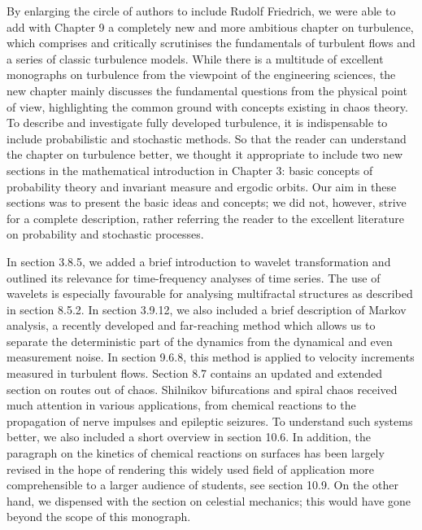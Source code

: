 \documentclass[12pt]{article}
\begin{document}
By enlarging the circle of authors to include Rudolf Friedrich, we were able to add
with Chapter 9 a completely new and more ambitious chapter on turbulence, which
comprises and critically scrutinises the fundamentals of turbulent flows and a series
of classic turbulence models. While there is a multitude of excellent monographs on
turbulence from the viewpoint of the engineering sciences, the new chapter mainly
discusses the fundamental questions from the physical point of view, highlighting
the common ground with concepts existing in chaos theory. To describe and investigate
fully developed turbulence, it is indispensable to include probabilistic and
stochastic methods. So that the reader can understand the chapter on turbulence
better, we thought it appropriate to include two new sections in the mathematical
introduction in Chapter 3: basic concepts of probability theory and invariant measure
and ergodic orbits. Our aim in these sections was to present the basic ideas and
concepts; we did not, however, strive for a complete description, rather referring
the reader to the excellent literature on probability and stochastic processes.

\hfill

In section 3.8.5, we added a brief introduction to wavelet transformation and outlined
its relevance for time-frequency analyses of time series. The use of wavelets
is especially favourable for analysing multifractal structures as described in section
8.5.2. In section 3.9.12, we also included a brief description of Markov analysis,
a recently developed and far-reaching method which allows us to separate the deterministic
part of the dynamics from the dynamical and even measurement noise. In
section 9.6.8, this method is applied to velocity increments measured in turbulent
flows. Section 8.7 contains an updated and extended section on routes out of chaos.
Shilnikov bifurcations and spiral chaos received much attention in various applications,
from chemical reactions to the propagation of nerve impulses and epileptic
seizures. To understand such systems better, we also included a short overview in
section 10.6. In addition, the paragraph on the kinetics of chemical reactions on
surfaces has been largely revised in the hope of rendering this widely used field of
application more comprehensible to a larger audience of students, see section 10.9.
On the other hand, we dispensed with the section on celestial mechanics; this would
have gone beyond the scope of this monograph.

\hfill
\end{document}
